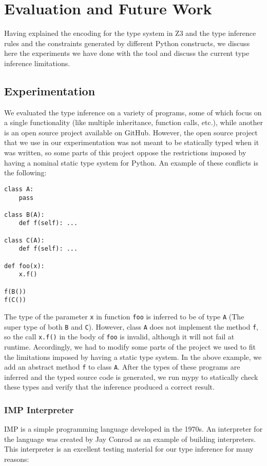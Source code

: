 
\chapter{Evaluation and Future Work}\label{chapter:eval}
Having explained the encoding for the type system in Z3 and the type inference rules and the constraints generated by different Python constructs, we discuss here the experiments we have done with the tool and discuss the current type inference limitations.

\section{Experimentation}
We evaluated the type inference on a variety of programs, some of which focus on a single functionality (like multiple inheritance, function calls, etc.), while another is an open source project available on GitHub. However, the open source project that we use in our experimentation was not meant to be statically typed when it was written, so some parts of this project oppose the restrictions imposed by having a nominal static type system for Python. An example of these conflicts is the following:

\begin{lstlisting}
class A:
	pass
	
class B(A):
	def f(self): ...

class C(A):
	def f(self): ...

def foo(x):
	x.f()
	
f(B())
f(C())
\end{lstlisting}
The type of the parameter \lstinline|x| in function \lstinline|foo| is inferred to be of type \lstinline|A| (The super type of both \lstinline|B| and \lstinline|C|). However, class \lstinline|A| does not implement the method \lstinline|f|, so the call \lstinline|x.f()| in the body of \lstinline|foo| is invalid, although it will not fail at runtime. Accordingly, we had to modify some parts of the project we used to fit the limitations imposed by having a static type system. In the above example, we add an abstract method \lstinline|f| to class \lstinline|A|. After the types of these programs are inferred and the typed source code is generated, we run mypy \cite{mypy} to statically check these types and verify that the inference produced a correct result.
\subsection{IMP Interpreter}
IMP \cite{imp} is a simple programming language developed in the 1970s. An interpreter for the language \cite{imp_i} was created by Jay Conrod as an example of building interpreters. This interpreter is an excellent testing material for our type inference for many reasons:

